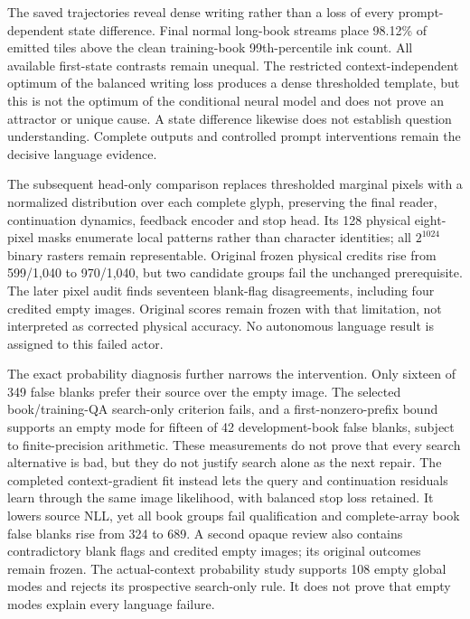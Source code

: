 \documentclass[12pt,a4paper]{article}
\providecommand{\DIFadd}[1]{{\protect\color{blue} \sf #1}} %
\begin{document}
\DIFadd{The saved trajectories reveal dense writing rather than a loss of every
prompt-dependent state difference. Final normal long-book streams place
98.12\% of emitted tiles above the clean training-book 99th-percentile ink
count. All available first-state contrasts remain unequal. The restricted
context-independent optimum of the balanced writing loss produces a dense
thresholded template, but this is not the optimum of the conditional neural
model and does not prove an attractor or unique cause. A state difference
likewise does not establish question understanding. Complete outputs and
controlled prompt interventions remain the decisive language evidence.
}

\DIFadd{The subsequent head-only comparison replaces thresholded marginal pixels with
a normalized distribution over each complete glyph, preserving the final
reader, continuation dynamics, feedback encoder and stop head. Its 128 physical
eight-pixel masks enumerate local patterns rather than character identities;
all $2^{1024}$ binary rasters remain representable. Original frozen physical
credits rise from 599/1,040 to 970/1,040, but two candidate groups fail the
unchanged prerequisite. The later pixel audit finds seventeen blank-flag
disagreements, including four credited empty images. Original scores remain
frozen with that limitation, not interpreted as corrected physical accuracy.
No autonomous language result is assigned to this failed actor.
}

\DIFadd{The exact probability diagnosis further narrows the intervention. Only sixteen
of 349 false blanks prefer their source over the empty image. The selected
book/training-QA search-only criterion fails, and a first-nonzero-prefix bound
supports an empty mode for fifteen of 42 development-book false blanks, subject
to finite-precision arithmetic. These measurements do not prove that every
search alternative is bad, but they do not justify search alone as the next
repair. The completed context-gradient fit instead lets the query and
continuation residuals learn through the same image likelihood, with balanced
stop loss retained. It lowers source NLL, yet all book groups fail qualification
and complete-array book false blanks rise from 324 to 689. A second opaque
review also contains contradictory blank flags and credited empty images; its
original outcomes remain frozen. The actual-context probability study supports
108 empty global modes and rejects its prospective search-only rule. It does
not prove that empty modes explain every language failure.
}
\end{document}
